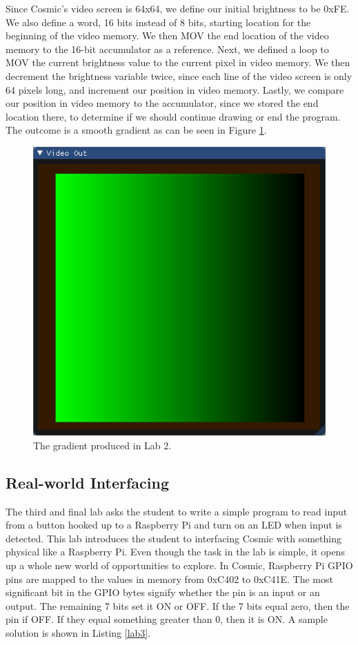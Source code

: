 \documentclass[conference]{IEEEtran}
\begin{document}
Since Cosmic's video screen is 64x64, we define our initial brightness to be 0xFE. We also define a word, 16 bits instead of 8 bits, starting location for the beginning of the video memory. We then MOV the end location of the video memory to the 16-bit accumulator as a reference. Next, we defined a loop to MOV the current brightness value to the current pixel in video memory. We then decrement the brightness variable twice, since each line of the video screen is only 64 pixels long, and increment our position in video memory. Lastly, we compare our position in video memory to the accumulator, since we stored the end location there, to determine if we should continue drawing or end the program. The outcome is a smooth gradient as can be seen in Figure \ref{fig:gradient}.

\begin{figure}[h!]
	\includegraphics[width=\linewidth]{lab_2_solution}
	\caption{The gradient produced in Lab 2.}
	\label{fig:gradient}
\end{figure}

\subsection{Real-world Interfacing}
The third and final lab asks the student to write a simple program to read input from a button hooked up to a Raspberry Pi and turn on an LED when input is detected. This lab introduces the student to interfacing Cosmic with something physical like a Raspberry Pi. Even though the task in the lab is simple, it opens up a whole new world of opportunities to explore. In Cosmic, Raspberry Pi GPIO pins are mapped to the values in memory from 0xC402 to 0xC41E. The most significant bit in the GPIO bytes signify whether the pin is an input or an output. The remaining 7 bits set it ON or OFF. If the 7 bits equal zero, then the pin if OFF. If they equal something greater than 0, then it is ON. A sample solution is shown in Listing \ref{lab3}.
\end{document}
